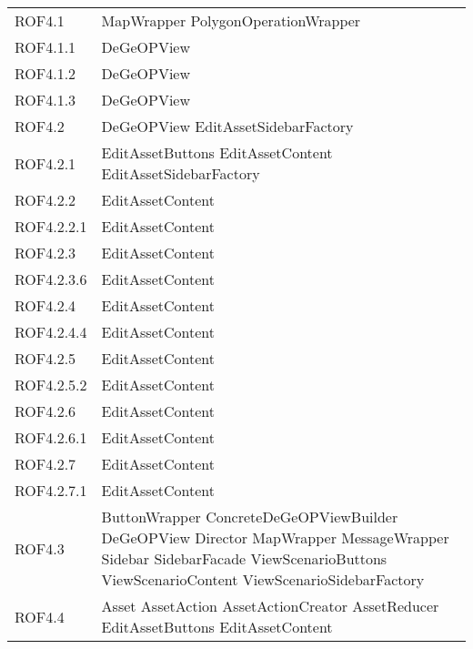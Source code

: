 \begin{longtable}{p{2.5cm}!{\VRule[1pt]}p{5cm}}
		ROF4.1 & MapWrapper \newline PolygonOperationWrapper\\
		ROF4.1.1 & DeGeOPView\\
		ROF4.1.2 & DeGeOPView\\
		ROF4.1.3 & DeGeOPView\\
		ROF4.2 & DeGeOPView \newline EditAssetSidebarFactory\\
		ROF4.2.1 & EditAssetButtons \newline EditAssetContent \newline EditAssetSidebarFactory\\
		ROF4.2.2 & EditAssetContent\\
		ROF4.2.2.1 & EditAssetContent\\
		ROF4.2.3 & EditAssetContent\\
		ROF4.2.3.6 & EditAssetContent\\
		ROF4.2.4 & EditAssetContent\\
		ROF4.2.4.4 & EditAssetContent\\
		ROF4.2.5 & EditAssetContent\\
		ROF4.2.5.2 & EditAssetContent\\
		ROF4.2.6 & EditAssetContent\\
		ROF4.2.6.1 & EditAssetContent\\
		ROF4.2.7 & EditAssetContent\\
		ROF4.2.7.1 & EditAssetContent\\
		ROF4.3 & ButtonWrapper \newline ConcreteDeGeOPViewBuilder \newline DeGeOPView \newline Director \newline MapWrapper \newline MessageWrapper \newline Sidebar \newline SidebarFacade \newline ViewScenarioButtons \newline ViewScenarioContent \newline ViewScenarioSidebarFactory\\
		ROF4.4 & Asset \newline AssetAction \newline AssetActionCreator \newline AssetReducer \newline EditAssetButtons \newline EditAssetContent\\

\end{longtable}
